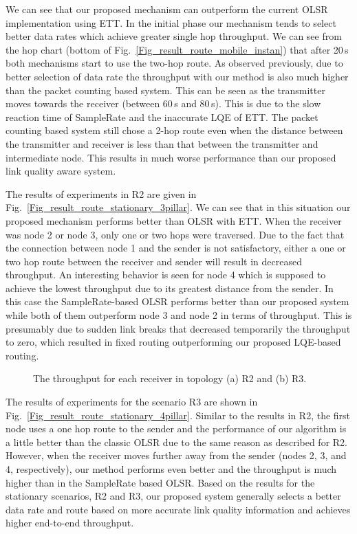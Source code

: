\documentclass[11pt,draftclsnofoot,journal,onecolumn]{IEEEtran}
\begin{document}
We can see that our proposed mechanism can outperform the current OLSR implementation using ETT. In the initial phase our mechanism tends to select better data rates which achieve greater single hop throughput. We can see from the hop chart (bottom of Fig.~\ref{Fig_result_route_mobile_instan}) that after 20\,s both mechanisms start to use the two-hop route. As observed previously, due to better selection of data rate the throughput with our method is also much higher than the packet counting based system. This can be seen as the transmitter moves towards the receiver (between 60\,s and 80\,s). This is due to the slow reaction time of SampleRate and the inaccurate LQE of ETT. The packet counting based system still chose a 2-hop route even when the distance between the transmitter and receiver is less than that between the transmitter and intermediate node. This results in much worse performance than our proposed link quality aware system.

The results of experiments in R2 are given in Fig.~\ref{Fig_result_route_stationary_3pillar}. We can see that in this situation our proposed mechanism performs better than OLSR with ETT. When the receiver was node 2 or node 3, only one or two hops were traversed. Due to the fact that the connection between node 1 and the sender is not satisfactory, either a one or two hop route between the receiver and sender will result in decreased throughput. An interesting behavior is seen for node 4 which is supposed to achieve the lowest throughput due to its greatest distance from the sender. In this case the SampleRate-based OLSR performs better than our proposed system while both of them outperform node 3 and node 2 in terms of throughput. This is presumably due to sudden link breaks that decreased temporarily the throughput to zero, which resulted in fixed routing outperforming our proposed LQE-based routing.
\begin{figure}
\centering
{}
\caption{The throughput for each receiver in topology (a) R2 and (b) R3.}
\end{figure}

The results of experiments for the scenario R3 are shown in Fig.~\ref{Fig_result_route_stationary_4pillar}. Similar to the results in R2, the first node uses a one hop route to the sender and the performance of our algorithm is a little better than the classic OLSR due to the same reason as described for R2. However, when the receiver moves further away from the sender (nodes 2, 3, and 4, respectively), our method performs even better and the throughput is much higher than in the SampleRate based OLSR. Based on the results for the stationary scenarios, R2 and R3, our proposed system generally selects a better data rate and route based on more accurate link quality information and achieves higher end-to-end throughput.
\end{document}
